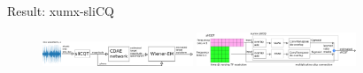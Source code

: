 \documentclass[final]{beamer}
\begin{document}
\begin{frame}{}
\begin{block}{Result: xumx-sliCQ}
\begin{enumerate}
	  \end{enumerate}
		\let\thefootnote\relax{}
    \end{block}
	  \begin{figure}
		  \centering
		  \includegraphics[width=0.4\textwidth]{./images-blockdiagrams/xumx_slicq_clean.png}
		  \hspace{1em}
		  \includegraphics[width=0.425\textwidth]{./images-poster/xumx_cdae_poster.png}
	  \end{figure}
  \end{frame}
\end{document}
